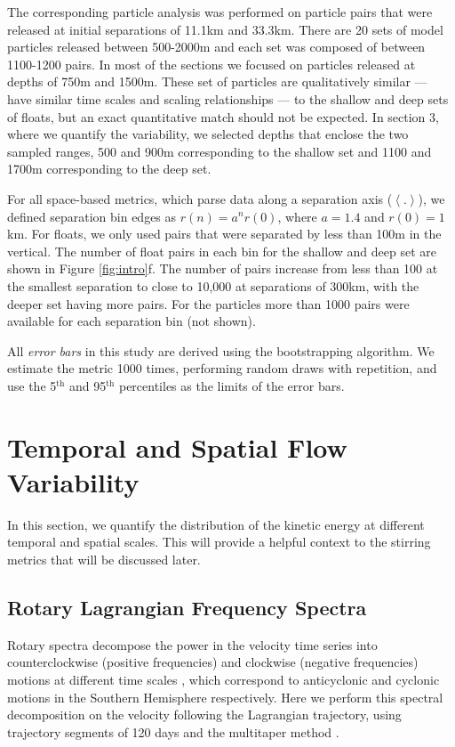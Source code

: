 \documentclass[]{ametsoc}
\begin{document}
The corresponding particle analysis was performed on particle pairs that were released at initial separations of 11.1km and 33.3km. There are 20 sets of model particles released between 500-2000m and each set was composed of between 1100-1200 pairs. In most of the sections we focused on particles released at depths of 750m and 1500m. These set of particles are qualitatively similar --- have similar time scales and scaling relationships --- to the shallow and deep sets of floats, but an exact quantitative match should not be expected. In section 3, where we quantify the variability, we selected depths that enclose the two sampled ranges, 500 and 900m corresponding to the shallow set and 1100 and 1700m corresponding to the deep set.

For all space-based metrics, which parse data along a separation axis ($\left< . \right>$), we defined separation bin edges as $r (n) = a^n r (0)$, where $a = 1.4$ and $r (0) = 1$ km. For floats, we only used pairs that were separated by less than 100m in the vertical. The number of float pairs in each bin for the shallow and deep set are shown in Figure \ref{fig:intro}f. The number of pairs increase from less than 100 at the smallest separation to close to 10,000 at separations of 300km, with the deeper set having more pairs. For the particles more than 1000 pairs were available for each separation bin (not shown).  

All \textit{error bars} in this study are derived using the bootstrapping algorithm. We estimate the metric 1000 times, performing random draws with repetition, and use the 5$^\text{th}$ and 95$^\text{th}$ percentiles as the limits of the error bars.

\section{Temporal and Spatial Flow Variability}
In this section, we quantify the distribution of the kinetic energy at different temporal and spatial scales. This will provide a helpful context to the stirring metrics that will be discussed later.

\subsection{Rotary Lagrangian Frequency Spectra}
Rotary spectra decompose the power in the velocity time series into counterclockwise (positive frequencies) and clockwise (negative frequencies) motions at different time scales \citep{thomson2014data}, which correspond to anticyclonic and cyclonic motions in the Southern Hemisphere respectively. Here we perform this spectral decomposition on the velocity following the Lagrangian trajectory, using trajectory segments of 120 days and the multitaper method \citep{lilly2019jlab}. 
\end{document}
